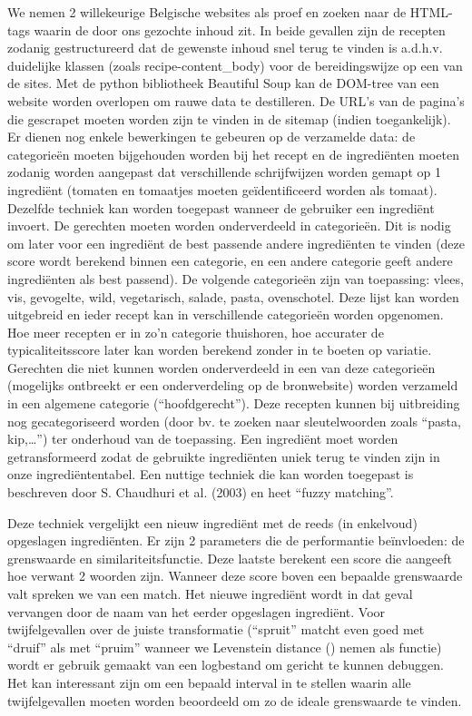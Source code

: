 \documentclass{hogent-article}
\begin{document}
We nemen 2 willekeurige Belgische websites als proef en zoeken naar de HTML-tags waarin de door ons gezochte inhoud zit. In beide gevallen zijn de recepten zodanig gestructureerd dat de gewenste inhoud snel terug te vinden is a.d.h.v. duidelijke klassen (zoals recipe-content\_body) voor de bereidingswijze op een van de sites. Met de python bibliotheek Beautiful Soup kan de DOM-tree van een website worden overlopen om rauwe data te destilleren. De URL's van de pagina's die gescrapet moeten worden zijn te vinden in de sitemap (indien toegankelijk).  Er dienen nog enkele bewerkingen te gebeuren op de verzamelde data: de categorieën moeten bijgehouden worden bij het recept en de ingrediënten moeten zodanig worden aangepast dat verschillende schrijfwijzen worden gemapt op 1 ingrediënt (tomaten en tomaatjes moeten geïdentificeerd worden als tomaat). Dezelfde techniek kan worden toegepast wanneer de gebruiker een ingrediënt invoert.
De gerechten moeten worden onderverdeeld in categorieën. Dit is nodig om later voor een ingrediënt de best passende andere ingrediënten te vinden (deze score wordt berekend binnen een categorie, en een andere categorie geeft andere ingrediënten als best passend). De volgende categorieën zijn van toepassing: vlees, vis, gevogelte, wild, vegetarisch, salade, pasta, ovenschotel. Deze lijst kan worden uitgebreid en ieder recept kan in verschillende categorieën worden opgenomen. Hoe meer recepten er in zo'n categorie thuishoren, hoe accurater de typicaliteitsscore later kan worden berekend zonder in te boeten op variatie. Gerechten die niet kunnen worden onderverdeeld in een van deze categorieën (mogelijks ontbreekt er een onderverdeling op de bronwebsite) worden verzameld in een algemene categorie (“hoofdgerecht”). Deze recepten kunnen bij uitbreiding nog gecategoriseerd worden (door bv. te zoeken naar sleutelwoorden zoals “pasta, kip,…”) ter onderhoud van de toepassing.
Een ingrediënt moet worden getransformeerd zodat de gebruikte ingrediënten uniek terug te vinden zijn in onze ingrediëntentabel. Een nuttige techniek die kan worden toegepast is beschreven door S. Chaudhuri et al. (2003) en heet “fuzzy matching”.  

Deze techniek vergelijkt een nieuw ingrediënt met de reeds (in enkelvoud) opgeslagen ingrediënten. Er zijn 2 parameters die de performantie beïnvloeden: de grenswaarde en similariteitsfunctie. Deze laatste berekent een score die aangeeft hoe verwant 2 woorden zijn. Wanneer deze score boven een bepaalde grenswaarde valt spreken we van een match. Het nieuwe ingrediënt wordt in dat geval vervangen door de naam van het eerder opgeslagen ingrediënt. Voor twijfelgevallen over de juiste transformatie (“spruit” matcht even goed met “druif” als met “pruim” wanneer we Levenstein distance () nemen als functie) wordt er gebruik gemaakt van een logbestand om gericht te kunnen debuggen. Het kan interessant zijn om een bepaald interval in te stellen waarin alle twijfelgevallen moeten worden beoordeeld om zo de ideale grenswaarde te vinden.
\end{document}
